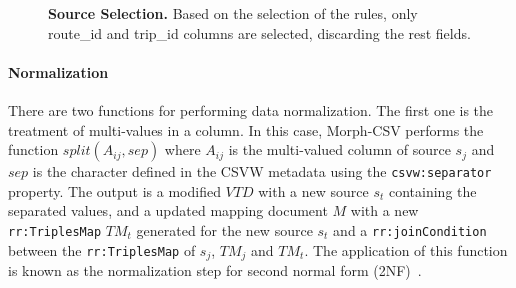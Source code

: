 \begin{figure}[ht]
\centering
{}
\caption[Source selection]{\textbf{Source Selection.} Based on the selection of the rules, only route\_id and trip\_id columns are selected, discarding the rest fields.}
\label{fig:selection2}
\end{figure}

\paragraph{Normalization}
There are two functions for performing data normalization. The first one is the treatment of multi-values in a column. In this case, Morph-CSV performs the function $split(A_{ij},sep)$ where $A_{ij}$ is the multi-valued column of source $s_{j}$ and $sep$ is the character defined in the CSVW metadata using the \texttt{csvw:separator} property. The output is a modified $VTD$ with a new source $s_t$ containing the separated values, and a updated mapping document $M$ with a new \texttt{rr:TriplesMap} $TM_t$ generated for the new source $s_t$ and a \texttt{rr:joinCondition} between the \texttt{rr:TriplesMap} of $s_j$, $TM_j$ and $TM_t$. 
The application of this function is known as the normalization step for second normal form (2NF)~\citep{codd1979extending}.
 

